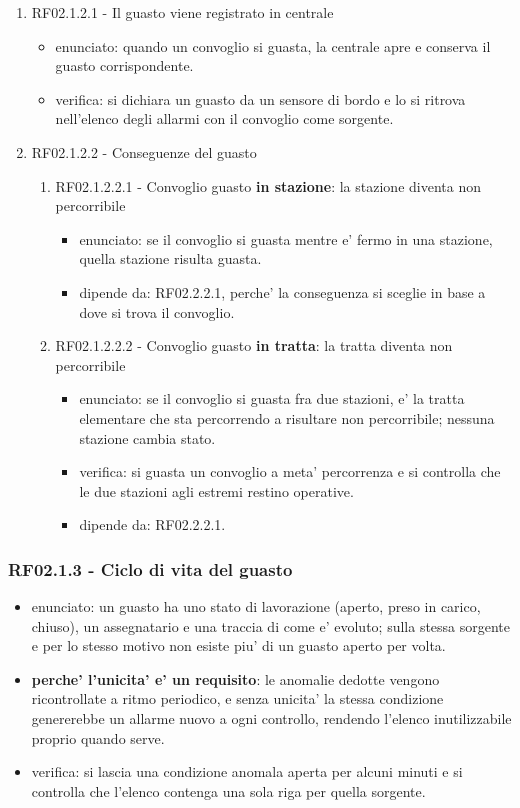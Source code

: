\documentclass[11pt]{article}
\begin{document}
\begin{enumerate}
\item RF02.1.2.1 - Il guasto viene registrato in centrale
\label{sec:org6179f12}
\begin{itemize}
\item enunciato: quando un convoglio si guasta, la centrale apre e conserva il guasto corrispondente.
\item verifica: si dichiara un guasto da un sensore di bordo e lo si ritrova nell'elenco degli allarmi
con il convoglio come sorgente.
\end{itemize}
\item RF02.1.2.2 - Conseguenze del guasto
\label{sec:orga574686}

\begin{enumerate}
\item RF02.1.2.2.1 - Convoglio guasto \textbf{in stazione}: la stazione diventa non percorribile
\label{sec:org80a35f9}
\begin{itemize}
\item enunciato: se il convoglio si guasta mentre e' fermo in una stazione, quella stazione risulta
guasta.
\item dipende da: RF02.2.2.1, perche' la conseguenza si sceglie in base a dove si trova il convoglio.
\end{itemize}
\item RF02.1.2.2.2 - Convoglio guasto \textbf{in tratta}: la tratta diventa non percorribile
\label{sec:orgec35b21}
\begin{itemize}
\item enunciato: se il convoglio si guasta fra due stazioni, e' la tratta elementare che sta percorrendo
a risultare non percorribile; nessuna stazione cambia stato.
\item verifica: si guasta un convoglio a meta' percorrenza e si controlla che le due stazioni agli
estremi restino operative.
\item dipende da: RF02.2.2.1.
\end{itemize}
\end{enumerate}
\end{enumerate}
\subsubsection{RF02.1.3 - Ciclo di vita del guasto}
\label{sec:org7421e2b}
\begin{itemize}
\item enunciato: un guasto ha uno stato di lavorazione (aperto, preso in carico, chiuso), un
assegnatario e una traccia di come e' evoluto; sulla stessa sorgente e per lo stesso motivo non
esiste piu' di un guasto aperto per volta.
\item \textbf{perche' l'unicita' e' un requisito}: le anomalie dedotte vengono ricontrollate a ritmo periodico,
e senza unicita' la stessa condizione genererebbe un allarme nuovo a ogni controllo, rendendo
l'elenco inutilizzabile proprio quando serve.
\item verifica: si lascia una condizione anomala aperta per alcuni minuti e si controlla che l'elenco
contenga una sola riga per quella sorgente.
\end{itemize}
\end{document}
